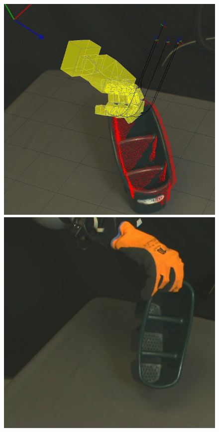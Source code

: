 \begin{figure}
\begin{center}
  \includegraphics[width=\tw]{images/experiments/query/stand1-1-s} \hspace{-6pt}
 \includegraphics[width=\tw]{images/experiments/exec/stand1-s}

\end{center}
\end{figure}
